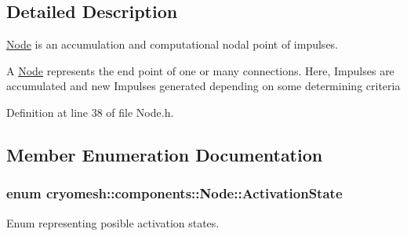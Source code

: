 \subsection{\-Detailed \-Description}
\hyperlink{classcryomesh_1_1components_1_1Node}{\-Node} is an accumulation and computational nodal point of impulses. 

\-A \hyperlink{classcryomesh_1_1components_1_1Node}{\-Node} represents the end point of one or many connections. \-Here, \-Impulses are accumulated and new \-Impulses generated depending on some determining criteria 

\-Definition at line 38 of file \-Node.\-h.



\subsection{\-Member \-Enumeration \-Documentation}
\hypertarget{classcryomesh_1_1components_1_1Node_a291becdd589b5bd338d5c0dd28199798}{
\subsubsection[{\-Activation\-State}]{\setlength{\rightskip}{0pt plus 5cm}enum {\bf cryomesh\-::components\-::\-Node\-::\-Activation\-State}}}\label{classcryomesh_1_1components_1_1Node_a291becdd589b5bd338d5c0dd28199798}


\-Enum representing posible activation states. 

